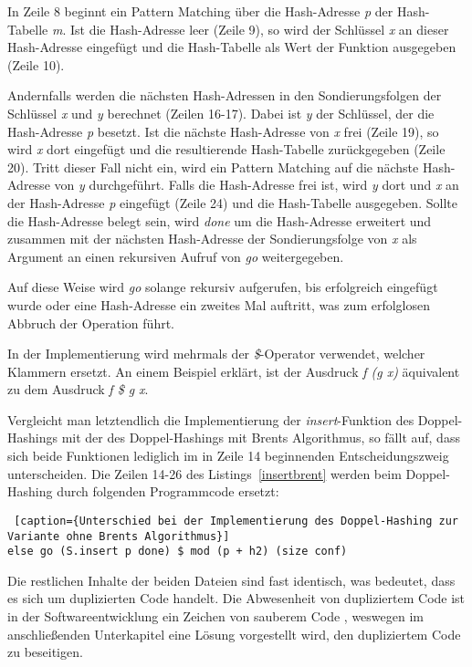 In Zeile 8 beginnt ein Pattern Matching über die Hash-Adresse \textit{p} der Hash-Tabelle \textit{m}. Ist die Hash-Adresse leer (Zeile 9), so wird der Schlüssel \textit{x} an dieser Hash-Adresse eingefügt und die Hash-Tabelle als Wert der Funktion ausgegeben (Zeile 10).

Andernfalls werden die nächsten Hash-Adressen in den Sondierungsfolgen der Schlüssel \textit{x} und \textit{y} berechnet (Zeilen 16-17). Dabei ist \textit{y} der Schlüssel, der die Hash-Adresse \textit{p} besetzt. Ist die nächste Hash-Adresse von \textit{x} frei (Zeile 19), so wird \textit{x} dort eingefügt und die resultierende Hash-Tabelle zurückgegeben (Zeile 20). Tritt dieser Fall nicht ein, wird ein Pattern Matching auf die nächste Hash-Adresse von \textit{y} durchgeführt. Falls die Hash-Adresse frei ist, wird \textit{y} dort und \textit{x} an der Hash-Adresse \textit{p} eingefügt (Zeile 24) und die Hash-Tabelle ausgegeben. Sollte die Hash-Adresse belegt sein, wird \textit{done} um die Hash-Adresse  erweitert und zusammen mit der nächsten Hash-Adresse der Sondierungsfolge von \textit{x} als Argument an einen rekursiven Aufruf von \textit{go} weitergegeben. 

Auf diese Weise wird \textit{go} solange rekursiv aufgerufen, bis erfolgreich eingefügt wurde oder eine Hash-Adresse ein zweites Mal auftritt, was zum erfolglosen Abbruch der Operation führt.

In der Implementierung wird mehrmals der \textit{\$}-Operator verwendet, welcher Klammern ersetzt. An einem Beispiel erklärt, ist der Ausdruck \textit{f (g x)} äquivalent zu dem Ausdruck \textit{f \$ g x}. 

Vergleicht man letztendlich die Implementierung der \textit{insert}-Funktion des Doppel-Hashings mit der des Doppel-Hashings mit Brents Algorithmus, so fällt auf, dass sich beide Funktionen lediglich im in Zeile 14 beginnenden Entscheidungszweig unterscheiden. Die Zeilen 14-26 des Listings~\ref{insertbrent} werden beim Doppel-Hashing durch folgenden Programmcode ersetzt:
\begin{lstlisting} [caption={Unterschied bei der Implementierung des Doppel-Hashing zur Variante ohne Brents Algorithmus}]
else go (S.insert p done) $ mod (p + h2) (size conf)
\end{lstlisting}
Die restlichen Inhalte der beiden Dateien sind fast identisch, was bedeutet, dass es sich um duplizierten Code handelt. Die Abwesenheit von dupliziertem Code ist in der Softwareentwicklung ein Zeichen von sauberem Code \cite[S.~37]{cleancode}, weswegen im anschließenden Unterkapitel eine Lösung vorgestellt wird, den dupliziertem Code zu beseitigen.

